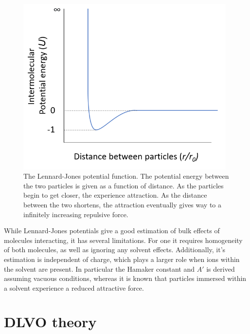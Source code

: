 \begin{figure}[h]     %
        \begin{center}
          \includegraphics[width=110mm]{chapter1/Lennard's potato.PNG}
\end{center}
\caption{The Lennard-Jones potential function. The potential energy between the two particles is given as a function of distance. As the particles begin to get closer, the experience attraction. As the distance between the two shortens, the attraction eventually gives way to a infinitely increasing repulsive force.}
\label{fig:potato}                 %
\end{figure}

While Lennard-Jones potentials give a good estimation of bulk effects of molecules interacting, it has several limitations. For one it requires homogeneity of both molecules, as well as ignoring any solvent effects. Additionally, it's estimation is independent of charge, which plays a larger role when ions within the solvent are present. In particular the Hamaker constant and $A'$ is derived assuming vacuous conditions, whereas it is known that particles immersed within a solvent experience a reduced attractive force. \cite{} %


\section{DLVO theory}

